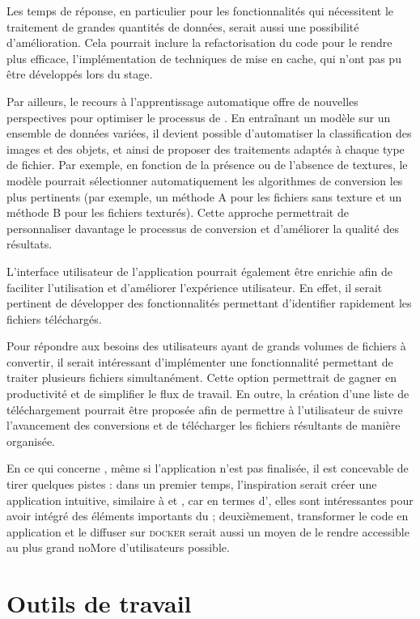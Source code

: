     Les temps de réponse, en particulier pour les fonctionnalités qui nécessitent le traitement de grandes quantités de données, serait aussi une possibilité d'amélioration. Cela pourrait inclure la refactorisation du code pour le rendre plus efficace, l'implémentation de techniques de mise en cache, qui n'ont pas pu être développés lors du stage. 
    
    Par ailleurs, le recours à l'apprentissage automatique offre de nouvelles perspectives pour optimiser le processus de \msh. En entraînant un modèle sur un ensemble de données variées, il devient possible d'automatiser la classification des images et des objets, et ainsi de proposer des traitements adaptés à chaque type de fichier. Par exemple, en fonction de la présence ou de l'absence de textures, le modèle pourrait sélectionner automatiquement les algorithmes de conversion les plus pertinents (par exemple, un méthode A pour les fichiers sans texture et un méthode B pour les fichiers texturés). Cette approche permettrait de personnaliser davantage le processus de conversion et d'améliorer la qualité des résultats.

    L'interface utilisateur de l'application pourrait également être enrichie afin de faciliter l'utilisation et d'améliorer l'expérience utilisateur. En effet, il serait pertinent de développer des fonctionnalités permettant d'identifier rapidement les fichiers téléchargés.

    Pour répondre aux besoins des utilisateurs ayant de grands volumes de fichiers à convertir, il serait intéressant d'implémenter une fonctionnalité permettant de traiter plusieurs fichiers simultanément. Cette option permettrait de gagner en productivité et de simplifier le flux de travail. En outre, la création d'une liste de téléchargement pourrait être proposée afin de permettre à l'utilisateur de suivre l'avancement des conversions et de télécharger les fichiers résultants de manière organisée.
    
    En ce qui concerne \diiif, même si l'application n'est pas finalisée, il est concevable de tirer quelques pistes : dans un premier temps, l'inspiration serait créer une application intuitive, similaire à \cvt et \msh, car en termes d'\ux, elles sont intéressantes pour avoir intégré des éléments importants du \gco ; deuxièmement, transformer le code en application et le diffuser sur \textsc{docker} serait aussi un moyen de le rendre accessible au plus grand noMore d'utilisateurs possible.

\chapter{Outils de travail}
